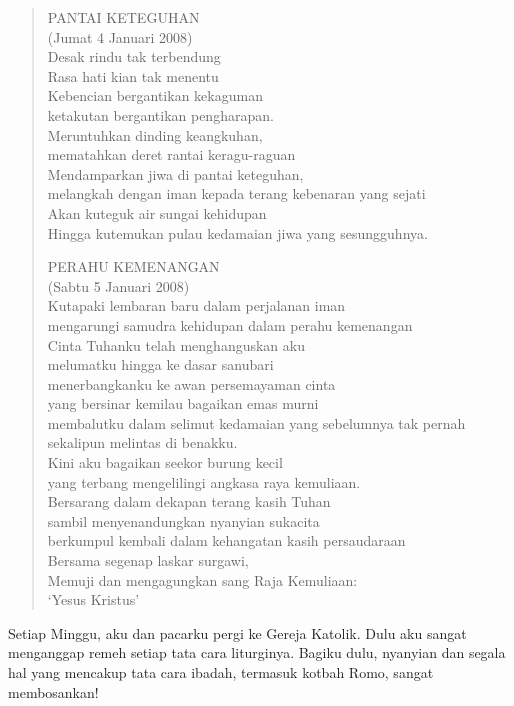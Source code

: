\begin{quote}
PANTAI KETEGUHAN\\
(Jumat 4 Januari 2008)\\
Desak rindu tak terbendung\\
Rasa hati kian tak menentu\\
Kebencian bergantikan kekaguman\\
ketakutan bergantikan pengharapan.\\
Meruntuhkan dinding keangkuhan,\\
mematahkan deret rantai keragu-raguan\\
Mendamparkan jiwa di pantai keteguhan,\\
melangkah dengan iman kepada terang kebenaran yang sejati\\
Akan kuteguk air sungai kehidupan\\
Hingga kutemukan pulau kedamaian jiwa yang sesungguhnya.\\

\bigskip

PERAHU KEMENANGAN\\
(Sabtu 5 Januari 2008)\\
Kutapaki lembaran baru dalam perjalanan iman\\
mengarungi samudra kehidupan dalam perahu kemenangan\\
Cinta Tuhanku telah menghanguskan aku\\
melumatku hingga ke dasar sanubari\\
menerbangkanku ke awan persemayaman cinta\\
yang bersinar kemilau bagaikan emas murni\\
membalutku dalam selimut kedamaian yang sebelumnya tak pernah sekalipun melintas di benakku.\\
Kini aku bagaikan seekor burung kecil\\
yang terbang mengelilingi angkasa raya kemuliaan.\\
Bersarang dalam dekapan terang kasih Tuhan\\
sambil menyenandungkan nyanyian sukacita\\
berkumpul kembali dalam kehangatan kasih persaudaraan\\
Bersama segenap laskar surgawi,\\
Memuji dan mengagungkan sang Raja Kemuliaan:\\
‘Yesus Kristus’
\end{quote}
Setiap Minggu, aku dan pacarku pergi ke Gereja Katolik. Dulu aku sangat menganggap remeh setiap tata cara liturginya. Bagiku dulu, nyanyian dan segala hal yang mencakup tata cara ibadah, termasuk kotbah Romo, sangat membosankan!

